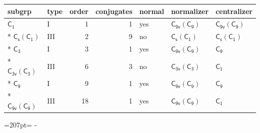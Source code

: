 \documentclass[10pt,a4paper]{article}
\newcommand{\needspace}[1]{\par\penalty-100\begingroup\dimen0=#1\relax\dimen2=\pagegoal
  \advance\dimen2-\pagetotal\ifdim\dimen0>\dimen2\relax\ifdim\dimen2>0pt\vfil\break\fi\fi
  \endgroup}
\numberwithin{equation}{section}
\newcommand{\grp}[1]{\mathsf{#1}}
\begin{document}
{\small\begin{longtable}{@{}llrrlll@{}}\toprule
subgrp & type & order & conjugates & normal & normalizer & centralizer\\\midrule\endhead
\bottomrule\endfoot\endlastfoot
\href{../../../rotation/data/pdf/C1.pdf}{$\grp{C_{1}}$} & I & 1 & 1 & yes & \href{C9v-C9.pdf}{$\grp{C_{9v}}(\grp{C_{9}})$} & \href{C9v-C9.pdf}{$\grp{C_{9v}}(\grp{C_{9}})$}\\*
\href{C1v-C1.pdf}{$\grp{C_{s}}(\grp{C_{1}})$} & III & 2 & 9 & no & \href{C1v-C1.pdf}{$\grp{C_{s}}(\grp{C_{1}})$} & \href{C1v-C1.pdf}{$\grp{C_{s}}(\grp{C_{1}})$}\\*
\href{../../../rotation/data/pdf/C3.pdf}{$\grp{C_{3}}$} & I & 3 & 1 & yes & \href{C9v-C9.pdf}{$\grp{C_{9v}}(\grp{C_{9}})$} & \href{../../../rotation/data/pdf/C9.pdf}{$\grp{C_{9}}$}\\*
\href{C3v-C3.pdf}{$\grp{C_{3v}}(\grp{C_{3}})$} & III & 6 & 3 & no & \href{C3v-C3.pdf}{$\grp{C_{3v}}(\grp{C_{3}})$} & \href{../../../rotation/data/pdf/C1.pdf}{$\grp{C_{1}}$}\\*
\href{../../../rotation/data/pdf/C9.pdf}{$\grp{C_{9}}$} & I & 9 & 1 & yes & \href{C9v-C9.pdf}{$\grp{C_{9v}}(\grp{C_{9}})$} & \href{../../../rotation/data/pdf/C9.pdf}{$\grp{C_{9}}$}\\*
\href{C9v-C9.pdf}{$\grp{C_{9v}}(\grp{C_{9}})$} & III & 18 & 1 & yes & \href{C9v-C9.pdf}{$\grp{C_{9v}}(\grp{C_{9}})$} & \href{../../../rotation/data/pdf/C1.pdf}{$\grp{C_{1}}$}\\
\bottomrule\end{longtable}}
\needspace{207pt}
\end{document}
